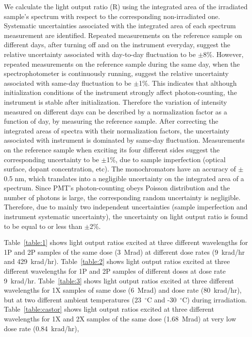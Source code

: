 \documentclass[preprint]{elsarticle}
\begin{document}
We calculate the light output ratio (R) using the integrated area of the irradiated sample's spectrum 
with respect to the corresponding non-irradiated one. 
Systematic uncertainties associated with the integrated area of each spectrum measurement are identified. 
Repeated measurements on the reference sample on different days, after turning off and on the instrument everyday, 
suggest the relative uncertainty associated with day-to-day fluctuation to be $\pm$8\%. 
However, repeated measurements on the reference sample during the same day, when the spectrophotometer is continuously running, 
suggest the relative uncertainty associated with same-day fluctuation to be $\pm$1\%. 
This indicates that although initialization conditions of the instrument strongly affect photon-counting, 
the instrument is stable after initialization.
Therefore the variation of intensity measured on different days can be described by a normalization factor as a function of day, 
by measuring the reference sample. 
After correcting the integrated areas of spectra with their normalization factors, 
the uncertainty associated with instrument is dominated by same-day fluctuation. 
Measurements on the reference sample when exciting its four different sides suggest the corresponding uncertainty to be $\pm$1\%, 
due to sample imperfection (optical surface, dopant concentration, etc). 
The monochromators have an accuracy of $\pm$0.5 nm, which translates into a negligible uncertainty on the integrated area of a spectrum. 
Since PMT's photon-counting obeys Poisson distribution and the number of photons is large, 
the corresponding random uncertainty is negligible. 
Therefore, due to mainly two independent uncertainties (sample imperfection and instrument systematic uncertainty), 
the uncertainty on light output ratio is found to be equal to or less than $\pm$2\%.

Table~\ref{table:1} shows light output ratios excited at three different wavelengths for 
1P and 2P samples of the same dose (3~Mrad) at different dose rates (9~krad/hr and 429~krad/hr). 
Table~\ref{table:2} shows light output ratios excited at three different wavelengths for 
1P and 2P samples of different doses at dose rate 9~krad/hr. 
Table~\ref{table:3} shows light output ratios excited at three different wavelengths for 
1X samples of same dose (6~Mrad) and dose rate (80~krad/hr), 
but at two different ambient temperatures (23~$^\circ$C and -30~$^\circ$C) during irradiation. 
Table~\ref{table:castor} shows light output ratios excited at three different wavelengths for 
1X and 2X samples of the same dose (1.68~Mrad) at very low dose rate (0.84~krad/hr), 
\end{document}
